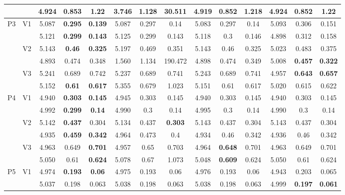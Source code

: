 \documentclass[12pt,a4paper]{article}
\begin{document}
\begin{sidewaystable}[ht]
{\begin{tabular}{cc|ccc|ccc|ccc|ccc|}
   &  & 4.924 & 0.853 & 1.22 & 3.746 & 1.128 & 30.511 & 4.919 & \textbf{0.852} & \textbf{1.218} & 4.924 & 0.852 & 1.22 \\ 
   \hline \hline\multirow{6}{*}{P3} & \multirow{2}{*}{V1} & 5.087 & \textbf{0.295} & \textbf{0.139} & 5.087 & 0.297 & 0.14 & 5.083 & 0.297 & 0.14 & 5.093 & 0.306 & 0.151 \\ 
   &  & 5.121 & \textbf{0.299} & \textbf{0.143} & 5.125 & 0.299 & 0.143 & 5.118 & 0.3 & 0.146 & 4.898 & 0.312 & 0.158 \\ 
   & \multirow{2}{*}{V2} & 5.143 & \textbf{0.46} & \textbf{0.325} & 5.197 & 0.469 & 0.351 & 5.143 & 0.46 & 0.325 & 5.023 & 0.483 & 0.375 \\ 
   &  & 4.893 & 0.474 & 0.348 & 1.560 & 1.134 & 190.472 & 4.898 & 0.474 & 0.349 & 5.008 & \textbf{0.457} & \textbf{0.322} \\ 
   & \multirow{2}{*}{V3} & 5.241 & 0.689 & 0.742 & 5.237 & 0.689 & 0.741 & 5.243 & 0.689 & 0.741 & 4.957 & \textbf{0.643} & \textbf{0.657} \\ 
   &  & 5.152 & \textbf{0.61} & \textbf{0.617} & 5.355 & 0.679 & 1.023 & 5.151 & 0.61 & 0.617 & 5.020 & 0.615 & 0.622 \\ 
   \hline \hline\multirow{6}{*}{P4} & \multirow{2}{*}{V1} & 4.940 & \textbf{0.303} & \textbf{0.145} & 4.945 & 0.303 & 0.145 & 4.940 & 0.303 & 0.145 & 4.940 & 0.303 & 0.145 \\ 
   &  & 4.992 & \textbf{0.299} & \textbf{0.14} & 4.990 & 0.3 & 0.14 & 4.995 & 0.3 & 0.14 & 4.990 & 0.3 & 0.14 \\ 
   & \multirow{2}{*}{V2} & 5.142 & \textbf{0.437} & 0.304 & 5.134 & 0.437 & \textbf{0.303} & 5.143 & 0.437 & 0.304 & 5.143 & 0.437 & 0.304 \\ 
   &  & 4.935 & \textbf{0.459} & \textbf{0.342} & 4.964 & 0.473 & 0.4 & 4.934 & 0.46 & 0.342 & 4.936 & 0.46 & 0.342 \\ 
   & \multirow{2}{*}{V3} & 4.963 & 0.649 & \textbf{0.701} & 4.957 & 0.65 & 0.703 & 4.964 & \textbf{0.648} & 0.701 & 4.963 & 0.649 & 0.701 \\ 
   &  & 5.050 & 0.61 & \textbf{0.624} & 5.078 & 0.67 & 1.073 & 5.048 & \textbf{0.609} & 0.624 & 5.050 & 0.61 & 0.624 \\ 
   \hline \hline\multirow{6}{*}{P5} & \multirow{2}{*}{V1} & 4.974 & \textbf{0.193} & \textbf{0.06} & 4.975 & 0.193 & 0.06 & 4.976 & 0.193 & 0.06 & 4.943 & 0.203 & 0.065 \\ 
   &  & 5.037 & 0.198 & 0.063 & 5.038 & 0.198 & 0.063 & 5.038 & 0.198 & 0.063 & 4.999 & \textbf{0.197} & \textbf{0.061} \\ 

\end{tabular}}
\end{sidewaystable}
\end{document}
